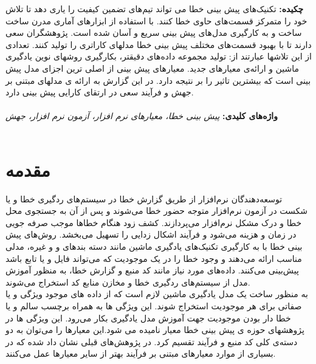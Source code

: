 \thispagestyle{empty}
\noindent
\renewcommand*\thesection{\arabic{section}}
\textbf{\large{چکیده:}}
تکنیک‌های پیش بینی خطا می تواند تیم‌های تضمین کیفیت را یاری دهد تا تلاش خود را متمرکز قسمت‌های حاوی خطا کنند. با استفاده از ابزارهای آماری مدرن ساخت ساخت و به کارگیری مدل‌های پیش بینی سریع و آسان شده است. پژوهشگران سعی دارند تا با بهبود قسمت‌های مختلف پیش بینی خطا مدلهای کاراتری را تولید کنند. تعدادی از این تلاشها عبارتند از: تولید مجموعه داده‌های دقیقتر، بکارگیری روشهای نوین یادگیری ماشین و ارائه‌ی معیارهای جدید. معیارهای پیش بینی از اصلی ترین اجزای مدل پیش بینی است که بیشترین تاثیر را بر نتیجه دارد. در این گزارش به ارائه ی مدلهای مبتنی بر جهش و فرآیند سعی در ارتقای کارایی پیش بینی دارد. 
\\\\
\textbf{واژه‌های کلیدی:}\textit{ 
پیش بینی خطا، معیارهای نرم افزار، آزمون نرم افزار، جهش
}\\\\
\section{مقدمه}
\label{sec:intro}
  توسعه‌دهندگان نرم‌افزار از طریق گزارش خطا در سیستم‌های ردگیری خطا و یا شکست در آزمون نرم‌افزار متوجه حضور خطا می‌شوند و پس از آن به جستجوی محل خطا و درک مشکل  نرم‌افزار می‌پردازند. کشف زود هنگام خطاها موجب صرفه جویی در زمان و هزینه می‌شود و فرآیند اشکال زدایی را تسهیل می‌بخشد. روش‌های پیش بینی خطا با به کارگیری تکنیک‌های یادگیری ماشین مانند دسته ‌بندهای  و   و غیره، مدلی مناسب ارائه می‌دهند و وجود خطا را در یک موجودیت که می‌تواند فایل و یا تابع باشد پیش‌بینی می‌کنند. داده‌های مورد نیاز مانند کد منبع و گزارش خطا، به منظور آموزش مدل از سیستم‌های ردگیری خطا و مخازن منابع کد استخراج می‌شوند. \\
  
 به منظور ساخت یک مدل یادگیری ماشین لازم است که از داده های موجود ویژگی و یا صفاتی   برای هر موجودیت استخراج شوند. این ویژگی ها به همراه برچسب سالم و یا خطا دار بودن موجودیت جهت آموزش مدل یادگیری بکار می‌رود. این ویژگی ها در پژوهشهای حوزه ی پیش بینی خطا معیار   نامیده می شود.این معیارها را می‌توان به دو دسته‌ی کلی کد منبع و فرآیند تقسیم کرد. در پژوهش‌های قبلی نشان داد شده که در بسیاری از موارد معیارهای مبتنی بر فرآیند بهتر از سایر معیارها عمل می‌کنند\cite{rahman2013and}\cite{radjenovic2013software}. \\
 
